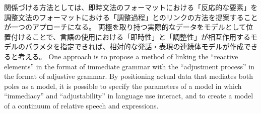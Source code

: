 \documentclass[a4paper,xelatex,ja=standard]{bxjsarticle}
\begin{document}
\ifJPN
関係づける方法としては、即時文法のフォーマットにおける「反応的な要素」を調整文法のフォーマットにおける「調整過程」とのリンクの方法を提案することが一つのアプローチになる。
両極を取り持つ実際的なデータをモデルとして位置付けることで、言語の使用における「即時性」と「調整性」が相互作用するモデルのパラメタを指定できれば、相対的な発話・表現の連続体モデルが作成できると考える。
\else
One approach is to propose a method of linking the ``reactive elements'' in the format of immediate grammar with the ``adjustment process'' in the format of adjustive grammar.
By positioning actual data that mediates both poles as a model, it is possible to specify the parameters of a model in which ``immediacy'' and ``adjustability'' in language use interact, and to create a model of a continuum of relative speech and expressions.
\fi



% 
% 
% 


\end{document}
